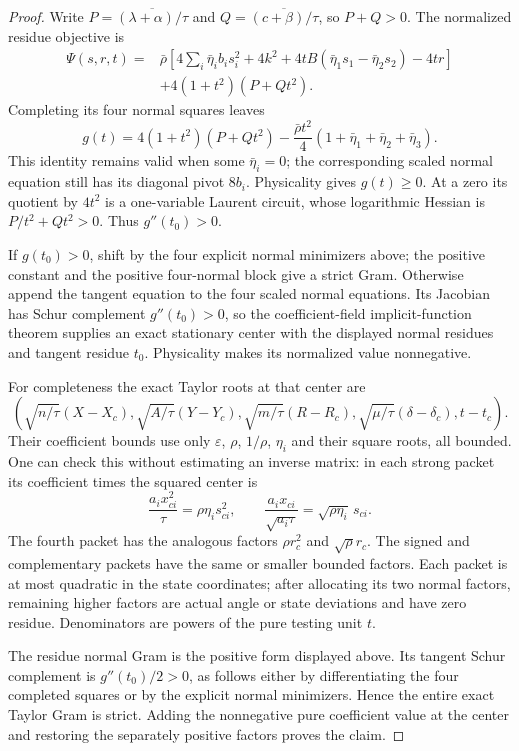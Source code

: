 \begin{proof}
Write $P=\overline{(\lambda+\alpha)/\tau}$ and
$Q=\overline{(c+\beta)/\tau}$, so $P+Q>0$. The normalized residue objective is
\begin{align*}
\Psi(s,r,t)={}&\bar\rho\left[
4\sum_i\bar\eta_i b_i s_i^2+4k^2
 +4tB(\bar\eta_1s_1-\bar\eta_2s_2)-4tr\right]\\
&+4(1+t^2)(P+Qt^2).
\end{align*}
Completing its four normal squares leaves
\[
g(t)=4(1+t^2)(P+Qt^2)
 -\frac{\bar\rho t^2}{4}(1+\bar\eta_1+\bar\eta_2+\bar\eta_3).
\]
This identity remains valid when some $\bar\eta_i=0$; the corresponding scaled normal equation still has its diagonal pivot $8b_i$. Physicality gives $g(t)\ge0$. At a zero its quotient by $4t^2$ is a one-variable Laurent circuit, whose logarithmic Hessian is $P/t^2+Qt^2>0$. Thus $g''(t_0)>0$.

If $g(t_0)>0$, shift by the four explicit normal minimizers above; the positive constant and the positive four-normal block give a strict Gram. Otherwise append the tangent equation to the four scaled normal equations. Its Jacobian has Schur complement $g''(t_0)>0$, so the coefficient-field implicit-function theorem supplies an exact stationary center with the displayed normal residues and tangent residue $t_0$. Physicality makes its normalized value nonnegative.

For completeness the exact Taylor roots at that center are
\[
\left(\sqrt{n/\tau}(X-X_c),\sqrt{A/\tau}(Y-Y_c),
\sqrt{m/\tau}(R-R_c),\sqrt{\mu/\tau}(\delta-\delta_c),t-t_c\right).
\]
Their coefficient bounds use only $\varepsilon$, $\rho$, $1/\rho$, $\eta_i$ and their square roots, all bounded. One can check this without estimating an inverse matrix: in each strong packet its coefficient times the squared center is
\[
\frac{a_i x_{ci}^2}{\tau}=\rho\eta_i s_{ci}^2,
\qquad
\frac{a_i x_{ci}}{\sqrt{a_i\tau}}=\sqrt{\rho\eta_i}\,s_{ci}.
\]
The fourth packet has the analogous factors $\rho r_c^2$ and $\sqrt\rho r_c$. The signed and complementary packets have the same or smaller bounded factors. Each packet is at most quadratic in the state coordinates; after allocating its two normal factors, remaining higher factors are actual angle or state deviations and have zero residue. Denominators are powers of the pure testing unit $t$.

The residue normal Gram is the positive form displayed above. Its tangent Schur complement is $g''(t_0)/2>0$, as follows either by differentiating the four completed squares or by the explicit normal minimizers. Hence the entire exact Taylor Gram is strict. Adding the nonnegative pure coefficient value at the center and restoring the separately positive factors proves the claim.
\end{proof}

